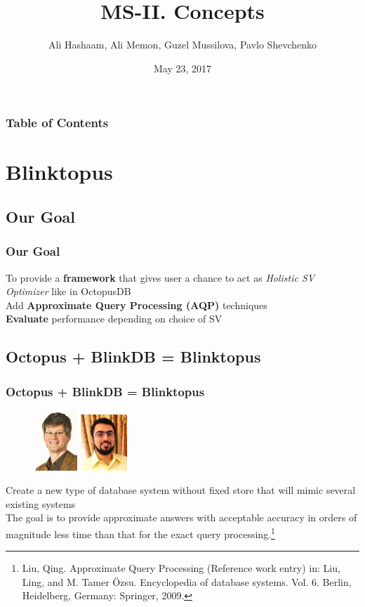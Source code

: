 \documentclass{beamer}
\title{MS-II. Concepts}
\author{Ali Hashaam, Ali Memon, Guzel Mussilova, Pavlo Shevchenko}
\date{May 23, 2017}
\institute{Scientific Project: Databases for Multi-Dimensional Data, Genomics and Modern Hardware}
\begin{document}
\begin{frame}[plain]
 \titlepage
\end{frame}

\begin{frame}
\frametitle{Table of Contents}
\tableofcontents 
\end{frame}

\section{Blinktopus}

\subsection{Our Goal}
\begin{frame}
\frametitle{Our Goal}
To provide a \textbf{framework} that gives user a chance to act as \textit{Holistic SV Optimizer} like in OctopusDB \\
Add \textbf{Approximate Query Processing (AQP)} techniques\\
\textbf{Evaluate} performance depending on choice of SV
\end{frame}

\subsection{Octopus + BlinkDB = Blinktopus}
\begin{frame}
\frametitle{Octopus + BlinkDB = Blinktopus}
\begin{figure}
\includegraphics[width=1.65cm]{img/jensdittrich.jpg}
\vspace{0.25 cm}
\includegraphics[width=1.75cm]{img/Mozafaribarzan.JPG}
\end{figure}

Create a new type of database system without fixed store that will mimic several existing systems\\
\vspace{2.2 cm}
The goal is to provide approximate answers with acceptable accuracy in orders of magnitude less time than that for the exact query processing.\footnote{\tiny Liu, Qing. Approximate Query Processing (Reference work entry) in: Liu, Ling, and M. Tamer Özsu. Encyclopedia of database systems. Vol. 6. Berlin, Heidelberg, Germany: Springer, 2009.}\\
\end{frame}
\end{document}
